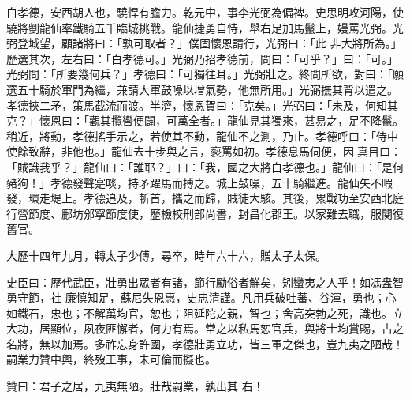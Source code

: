 \begin{pinyinscope}
 白孝德，安西胡人也，驍悍有膽力。乾元中，事李光弼為偏裨。史思明攻河陽，使驍將劉龍仙率鐵騎五千臨城挑戰。龍仙捷勇自恃，舉右足加馬鬣上，嫚罵光弼。光弼登城望，顧諸將曰：「孰可取者？」僕固懷恩請行，光弼曰：「此
 非大將所為。」歷選其次，左右曰：「白孝德可。」光弼乃招孝德前，問曰：「可乎？」曰：「可。」光弼問：「所要幾何兵？」孝德曰：「可獨往耳。」光弼壯之。終問所欲，對曰：「願選五十騎於軍門為繼，兼請大軍鼓噪以增氣勢，他無所用。」光弼撫其背以遣之。孝德挾二矛，策馬截流而渡。半濟，懷恩賀曰：「克矣。」光弼曰：「未及，何知其克？」懷恩曰：「觀其攬轡便闢，可萬全者。」龍仙見其獨來，甚易之，足不降鬣。稍近，將動，孝德搖手示之，若使其不動，龍仙不之測，乃止。孝德呼曰：「侍中
 使餘致辭，非他也。」龍仙去十步與之言，褻罵如初。孝德息馬伺便，因真目曰：「賊識我乎？」龍仙曰：「誰耶？」曰：「我，國之大將白孝德也。」龍仙曰：「是何豬狗！」孝德發聲寔啖，持矛躍馬而搏之。城上鼓噪，五十騎繼進。龍仙矢不暇發，環走堤上。孝德追及，斬首，攜之而歸，賊徒大駭。其後，累戰功至安西北庭行營節度、鄜坊邠寧節度使，歷檢校刑部尚書，封昌化郡王。以家難去職，服闋復舊官。



 大歷十四年九月，轉太子少傅，尋卒，時年六十六，贈太子太保。


史臣曰：歷代武臣，壯勇出眾者有諸，節行勵俗者鮮矣，矧蠻夷之人乎！如馮盎智勇守節，社
 廉慎知足，蘇尼失恩惠，史忠清謹。凡用兵破吐蕃、谷渾，勇也；心如鐵石，忠也；不解萬均官，恕也；阻延陀之親，智也；舍高突勃之死，識也。立大功，居顯位，夙夜匪懈者，何力有焉。常之以私馬恕官兵，與將士均賞賜，古之名將，無以加焉。多祚忘身許國，孝德壯勇立功，皆三軍之傑也，豈九夷之陋哉！嗣業力贊中興，終歿王事，未可倫而擬也。



 贊曰：君子之居，九夷無陋。壯哉嗣業，孰出其
 右！



\end{pinyinscope}